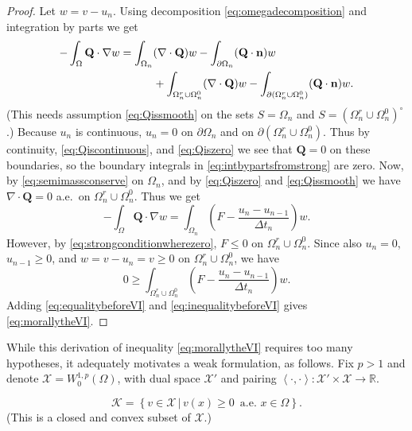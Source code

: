 \documentclass[final,onefignum]{siamart190516}
\newcommand\bn{\mathbf{n}}
\newcommand\bQ{\mathbf{Q}}
\newcommand{\Div}{\nabla\cdot}
\newcommand{\grad}{\nabla}
\newcommand{\ip}[2]{\ensuremath{\left<#1,#2\right>}}
\newcommand\RR{\mathbb{R}}
\begin{document}
\begin{proof}  Let $w=v-u_n$.  Using decomposition \eqref{eq:omegadecomposition} and integration by parts we get
\begin{align}
-\int_{\Omega} \bQ \cdot \grad w &= \int_{\Omega_n} (\Div \bQ) w - \int_{\partial \Omega_n} (\bQ \cdot \bn) w \label{eq:intbypartsfromstrong} \\
  &\qquad\quad + \int_{\Omega_n^r \cup \Omega_n^0} (\Div \bQ) w - \int_{\partial(\Omega_n^r \cup \Omega_n^0)} (\bQ \cdot \bn) w. \notag
\end{align}
(This needs assumption \eqref{eq:Qissmooth} on the sets $S=\Omega_n$ and $S=(\Omega_n^r \cup \Omega_n^0)^\circ$.)  Because $u_n$ is continuous, $u_n=0$ on $\partial \Omega_n$ and on $\partial(\Omega_n^r \cup \Omega_n^0)$.  Thus by continuity, \eqref{eq:Qiscontinuous}, and \eqref{eq:Qiszero} we see that $\bQ=0$ on these boundaries, so the boundary integrals in \eqref{eq:intbypartsfromstrong} are zero.  Now, by \eqref{eq:semimassconserve} on $\Omega_n$, and by \eqref{eq:Qiszero} and \eqref{eq:Qissmooth} we have $\Div \bQ=0$ a.e.~on $\Omega_n^r \cup \Omega_n^0$.  Thus we get
\begin{equation}
-\int_{\Omega} \bQ \cdot \grad w = \int_{\Omega_n} \left(F - \frac{u_n - u_{n-1}}{\Delta t_n}\right) w. \label{eq:equalitybeforeVI}
\end{equation}
However, by \eqref{eq:strongconditionwherezero}, $F \le 0$ on $\Omega_n^r \cup \Omega_n^0$.  Since also $u_n=0$, $u_{n-1}\ge 0$, and $w = v-u_n = v \ge 0$ on $\Omega_n^r \cup \Omega_n^0$, we have
\begin{equation}
    0 \ge \int_{\Omega_n^r \cup \Omega_n^0} \left(F - \frac{u_n - u_{n-1}}{\Delta t_n}\right) w. \label{eq:inequalitybeforeVI}
\end{equation}
Adding \eqref{eq:equalitybeforeVI} and \eqref{eq:inequalitybeforeVI} gives \eqref{eq:morallytheVI}.
\end{proof}

While this derivation of inequality \eqref{eq:morallytheVI} requires too many hypotheses, it adequately motivates a weak formulation, as follows.  Fix $p>1$ and denote $\mathcal{X} = W_0^{1,p}(\Omega)$, with dual space $\mathcal{X}'$ and pairing $\ip{\cdot}{\cdot}: \mathcal{X}' \times \mathcal{X} \to \RR$.

\begin{definition}
\begin{equation}
\mathcal{K} = \left\{v \in \mathcal{X} \,\big|\, v(x) \ge 0\, \text{ a.e.~} x \in \Omega\right\}.  \label{eq:defineK}
\end{equation}
(This is a closed and convex subset of $\mathcal{X}$.)
\end{definition}
\end{document}
